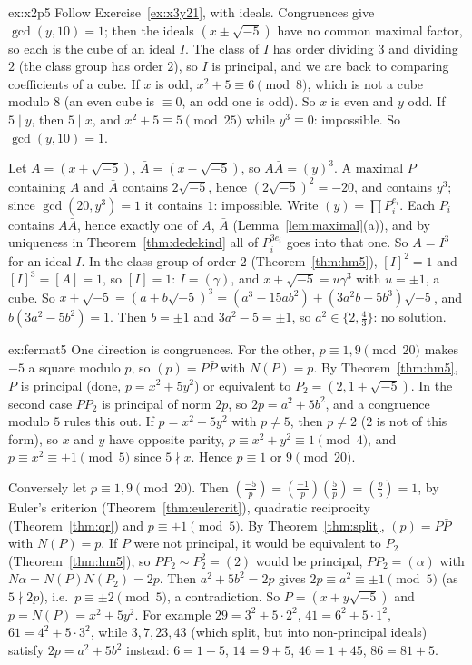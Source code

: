 \begin{solution}{ex:x2p5}
\idea Follow Exercise~\ref{ex:x3y21}, with ideals. Congruences give $\gcd(y,10)=1$; then the ideals $(x\pm\sqrt{-5})$ have no common maximal factor, so each is the cube of an ideal $I$. The class of $I$ has order dividing $3$ and dividing $2$ (the class group has order $2$), so $I$ is principal, and we are back to comparing coefficients of a cube.
\writeup If $x$ is odd, $x^2+5\equiv6\pmod8$, which is not a cube modulo $8$ (an even cube is $\equiv0$, an odd one is odd). So $x$ is even and $y$ odd. If $5\mid y$, then $5\mid x$, and $x^2+5\equiv5\pmod{25}$ while $y^3\equiv0$: impossible. So $\gcd(y,10)=1$.

Let $A=(x+\sqrt{-5})$, $\bar A=(x-\sqrt{-5})$, so $A\bar A=(y)^3$. A maximal $P$ containing $A$ and $\bar A$ contains $2\sqrt{-5}$, hence $(2\sqrt{-5})^2=-20$, and contains $y^3$; since $\gcd(20,y^3)=1$ it contains $1$: impossible. Write $(y)=\prod P_i^{e_i}$. Each $P_i$ contains $A\bar A$, hence exactly one of $A$, $\bar A$ (Lemma~\ref{lem:maximal}(a)), and by uniqueness in Theorem~\ref{thm:dedekind} all of $P_i^{3e_i}$ goes into that one. So $A=I^3$ for an ideal $I$. In the class group of order $2$ (Theorem~\ref{thm:hm5}), $[I]^2=1$ and $[I]^3=[A]=1$, so $[I]=1$: $I=(\gamma)$, and $x+\sqrt{-5}=u\gamma^3$ with $u=\pm1$, a cube. So $x+\sqrt{-5}=(a+b\sqrt{-5})^3=(a^3-15ab^2)+(3a^2b-5b^3)\sqrt{-5}$, and $b(3a^2-5b^2)=1$. Then $b=\pm1$ and $3a^2-5=\pm1$, so $a^2\in\{2,\frac43\}$: no solution.
\end{solution}

\begin{solution}{ex:fermat5}
\idea One direction is congruences. For the other, $p\equiv1,9\pmod{20}$ makes $-5$ a square modulo $p$, so $(p)=P\bar P$ with $N(P)=p$. By Theorem~\ref{thm:hm5}, $P$ is principal (done, $p=x^2+5y^2$) or equivalent to $P_2=(2,1+\sqrt{-5})$. In the second case $PP_2$ is principal of norm $2p$, so $2p=a^2+5b^2$, and a congruence modulo $5$ rules this out.
\writeup If $p=x^2+5y^2$ with $p\ne5$, then $p\ne2$ ($2$ is not of this form), so $x$ and $y$ have opposite parity, $p\equiv x^2+y^2\equiv1\pmod4$, and $p\equiv x^2\equiv\pm1\pmod5$ since $5\nmid x$. Hence $p\equiv1$ or $9\pmod{20}$.

Conversely let $p\equiv1,9\pmod{20}$. Then $\left(\frac{-5}p\right)=\left(\frac{-1}p\right)\left(\frac5p\right)=\left(\frac p5\right)=1$, by Euler's criterion (Theorem~\ref{thm:eulercrit}), quadratic reciprocity (Theorem~\ref{thm:qr}) and $p\equiv\pm1\pmod5$. By Theorem~\ref{thm:split}, $(p)=P\bar P$ with $N(P)=p$. If $P$ were not principal, it would be equivalent to $P_2$ (Theorem~\ref{thm:hm5}), so $PP_2\sim P_2^2=(2)$ would be principal, $PP_2=(\alpha)$ with $N\alpha=N(P)N(P_2)=2p$. Then $a^2+5b^2=2p$ gives $2p\equiv a^2\equiv\pm1\pmod5$ (as $5\nmid 2p$), i.e.\ $p\equiv\pm2\pmod5$, a contradiction. So $P=(x+y\sqrt{-5})$ and $p=N(P)=x^2+5y^2$. For example $29=3^2+5\cdot2^2$, $41=6^2+5\cdot1^2$, $61=4^2+5\cdot3^2$, while $3,7,23,43$ (which split, but into non-principal ideals) satisfy $2p=a^2+5b^2$ instead: $6=1+5$, $14=9+5$, $46=1+45$, $86=81+5$.
\end{solution}

